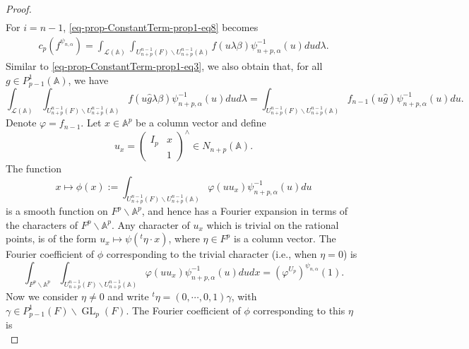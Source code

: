 \documentclass[12pt]{amsart}
\newcommand{\A}{\mathbb{A}}
\theoremstyle{remark}
\DeclareMathOperator{\GL}{GL}
\begin{document}
\begin{proof}
\begin{equation}
\begin{split}
\end{split}
\end{equation}
For $i=n-1$, \eqref{eq-prop-ConstantTerm-prop1-eq8} becomes
\begin{equation}
\label{eq-prop-ConstantTerm-prop1-eq10}
\begin{split}
c_p(f^{\psi_{n,\alpha}})
=\int_{\mathcal{L}(\A)}     \int_{U_{n+p}^{n-1}(F)\backslash U_{n+p}^{n-1}(\A)} f( u \lambda   \beta) \psi_{n+p,\alpha}^{-1}(u ) dud\lambda.	
\end{split}
\end{equation}
Similar to \eqref{eq-prop-ConstantTerm-prop1-eq3}, we also obtain that, for all $g\in P_{p-1}^1(\A)$, we have
\begin{equation}
\label{eq-prop-ConstantTerm-prop1-eq11}
\int_{\mathcal{L}(\A)}	\int_{U_{n+p}^{n-1}(F)\backslash U_{n+p}^{n-1}(\A)} f( u \hat{g}   \lambda \beta )\psi_{n+p,\alpha}^{-1}(u  ) du   d\lambda = \int_{U_{n+p}^{n-1}(F)\backslash U_{n+p}^{n-1}(\A)} f_{n-1}( u \hat{g} )\psi_{n+p,\alpha}^{-1}(u  ) du.
\end{equation}
Denote $\varphi=f_{n-1}$. Let $x\in \A^p$ be a column vector and define
\begin{equation*}
u_x= \begin{pmatrix} I_p & x \\ & 1\end{pmatrix}^\wedge\in N_{n+p}(\A).
\end{equation*}
The function
\begin{equation*}
x\mapsto \phi(x):=\int_{U_{n+p}^{n-1}(F)\backslash U_{n+p}^{n-1}(\A)} \varphi( u u_x)\psi_{n+p,\alpha}^{-1}(u)du
\end{equation*}
is a smooth function on $F^p\backslash \A^p$, and hence has a Fourier expansion in terms of the characters of $F^p\backslash \A^p$. Any character of $u_x$ which is trivial on the rational points, is of the form $u_x\mapsto \psi({}^t \eta \cdot x)$, where $\eta\in F^p$ is a column vector. 
The Fourier coefficient of $\phi$ corresponding to the trivial character (i.e., when $\eta=0$) is 
\begin{equation*}
\int_{F^p\backslash \A^p} 	\int_{U_{n+p}^{n-1}(F)\backslash U_{n+p}^{n-1}(\A)} \varphi( u u_x) \psi_{n+p,\alpha}^{-1}(u)dudx = (\varphi^{U_p})^{\psi_{n,\alpha}}(1).
\end{equation*}
Now we consider $\eta\not=0$ and write ${}^t \eta=(0, \cdots, 0, 1)\gamma$, with $\gamma\in P_{p-1}^1(F)\backslash \GL_p(F)$. The Fourier coefficient of $\phi$ corresponding to this $\eta$ is
\begin{equation}

\end{equation}
\end{proof}
\end{document}
